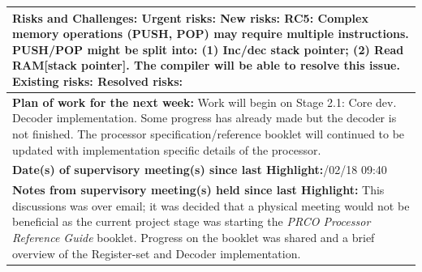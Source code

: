 \documentclass[11pt,a4paper]{article}
\begin{document}
\begin{table}[H]
\begin{tabularx}{\textwidth}{|X|}
	\\ \hline
	\textbf{Risks and Challenges:}\newline
	{\color{red} Urgent risks:}\newline
	{\color{orange} New risks:\newline
	RC5: Complex memory operations (PUSH, POP) may require multiple instructions. PUSH/POP might be split into: (1) Inc/dec stack pointer; (2) Read RAM[stack pointer]. The compiler will be able to resolve this issue.}\newline
	{\color{purple} Existing risks:}\newline
	{\color{gray} Resolved risks:}\newline
	\\ \hline
	\textbf{Plan of work for the next week:}\newline
	Work will begin on Stage 2.1: Core dev. Decoder implementation.\newline\newline
	Some progress has already made but the decoder is not finished.
	\newline
	The processor specification/reference booklet will continued to be updated with implementation specific details of the processor.
	\\ \hline
	\textbf{Date(s) of supervisory meeting(s) since last Highlight:}\newline
	13/02/18 09:40
	\\ \hline
	\textbf{Notes from supervisory meeting(s) held since last Highlight:}\newline
	This discussions was over email; it was decided that a physical meeting would not be beneficial as the current project stage was starting the \textit{PRCO Processor Reference Guide} booklet. Progress on the booklet was shared and a brief overview of the {\color{ballblue}Register-set} and {\color{ballblue}Decoder} implementation.
	\\ \hline
    \end{tabularx}
\end{table}

\newpage
\end{document}
